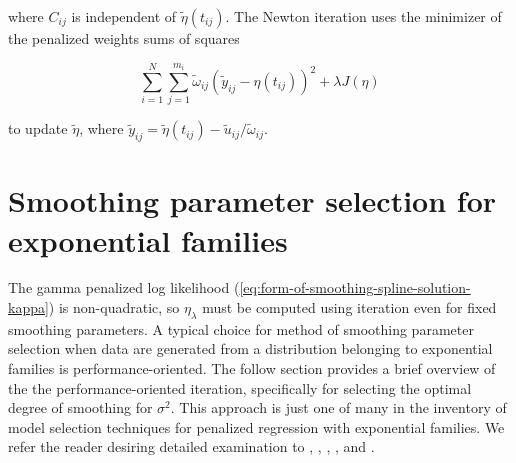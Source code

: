 \noindent
where $C_{ij}$ is independent of $\tilde{\eta}\left(t_{ij}\right)$.  The Newton iteration uses the minimizer of the penalized weights sums of squares

\begin{equation} \label{eq:penalized-weighted-sums-of-squares}
\sum_{i=1}^N\sum_{j=1}^{m_i} \tilde{\omega}_{ij}\left(\tilde{y}_{ij} - \eta\left(t_{ij}\right)  \right)^2 + \lambda J\left(\eta\right)
\end{equation}

\noindent
to update $\tilde{\eta}$, where $\tilde{y}_{ij} = \tilde{\eta}\left(t_{ij}\right) - \tilde{u}_{ij}/\tilde{\omega}_{ij}$.


\section{Smoothing parameter selection for exponential families}

%

The gamma penalized log likelihood (\ref{eq:form-of-smoothing-spline-solution-kappa}) is non-quadratic, so $\eta_\lambda$ must be computed using iteration even for fixed smoothing parameters. A typical choice for method of smoothing parameter selection when data are generated from a distribution belonging to exponential families is performance-oriented. The follow section provides a brief overview of the the performance-oriented iteration, specifically for selecting the optimal degree of smoothing for $\sigma^2$. This approach is just one of many in the inventory of model selection techniques for penalized regression with exponential families. We refer the reader desiring detailed examination to \cite{zhang2006component}, \cite{xiang1996generalized}, \cite{wahba1995smoothing},  \cite{wood2004stable}, and \cite{wood2017generalized}. 

